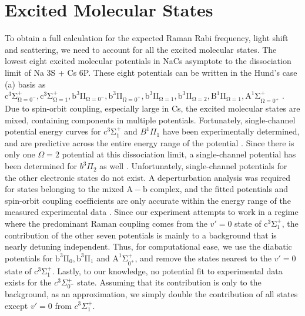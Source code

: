 \documentclass[aps,secnumarabic,amsmath,amssymb,10pt,superscriptaddress]{revtex4}
\begin{document}
\section{Excited Molecular States} \label{sm:excited_states}
To obtain a full calculation for the expected Raman Rabi frequency, light shift and scattering, we need to account for all the excited molecular states.
The lowest eight excited molecular potentials in NaCs asymptote to the dissociation limit of Na 3S + Cs 6P.
These eight potentials can be written in the Hund's case (a) basis as $ \mathrm{c^3\Sigma^+_{\Omega = 0^-},c^3\Sigma^+_{\Omega = 1}, b^3\Pi_{\Omega = 0^-}, b^3\Pi_{\Omega = 0^+}, b^3\Pi_{\Omega = 1}, b^3\Pi_{\Omega = 2}, B^1\Pi_{\Omega = 1}, A^1\Sigma^+_{\Omega = 0^+}}$ \cite{Korek2007}.
Due to spin-orbit coupling, especially large in Cs, the excited molecular states are mixed, containing components in multiple potentials.
Fortunately, single-channel potential energy curves for $\mathrm{c^3\Sigma^+_1}$ and $  B^1\Pi_1 $ have been experimentally determined, and are predictive across the entire energy range of the potential \cite{Grochola2010, Grochola2011, Liu2017}.
Since there is only one $ \Omega = 2$ potential at this dissociation limit, a single-channel potential has been determined for $ b^3\Pi_2$ as well \cite{Zabawa2012}.
Unfortunately, single-channel potentials for the other electronic states do not exist.
A deperturbation analysis was required for states belonging to the mixed $\mathrm{A-b}$ complex,
and the fitted potentials and spin-orbit coupling coefficients are only accurate within the energy range of the measured experimental data \cite{Zaharova2009}.
Since our experiment attempts to work in a regime where the predominant Raman coupling comes from the $v' = 0$ state of $ \mathrm{c^3\Sigma^+_1} $,
the contribution of the other seven potentials is mainly to a background that is nearly detuning independent.
Thus, for computational ease, we use the diabatic potentials for $ \mathrm{b^3\Pi_{0}, b^3\Pi_{1}} $ and $ \mathrm{A^1\Sigma^+_{0^+}}$, and remove the states nearest to the $ v' = 0$ state of $ \mathrm{c^3\Sigma^+_1} $.
Lastly, to our knowledge, no potential fit to experimental data exists for the $ c^3\Sigma^+_{0^-}$ state. Assuming that its contribution is only to the background, as an approximation, we simply double the contribution of all states except $v' = 0$ from $ c^3\Sigma^+_1$.
\end{document}
